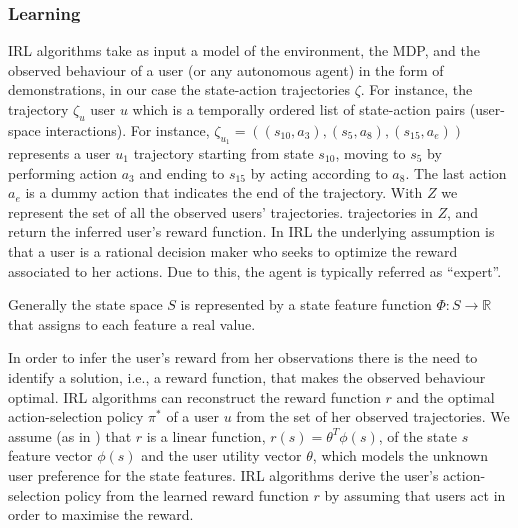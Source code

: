 \subsubsection{Learning}
IRL algorithms take as input a model of the environment, the MDP, and the observed behaviour of a user (or any autonomous agent) in the form of demonstrations, in our case the state-action trajectories $\zeta$.
For instance, the trajectory $\zeta_u$ user $u$ which is a temporally ordered list of state-action pairs (user-space interactions). 
For instance, $\zeta_{u_1} = ((s_{10},a_{3}), (s_5,a_8), (s_{15}, a_e))$ represents a user $u_1$ trajectory starting from state $s_{10}$, moving to $s_5$ by performing action $a_3$ 
and ending to $s_{15}$ by acting according to $a_8$. The last action $a_e$ is a dummy action that indicates the end of the trajectory. With $Z$ we represent the set of all the observed users' trajectories. 
trajectories in $Z$,
and return the inferred user's reward function. In IRL the underlying assumption is that a user is a rational decision maker who seeks to optimize the reward associated to her actions. Due to this, the agent is typically referred as ``expert''.

Generally the state space $S$ is represented by a state feature function $\Phi:S \rightarrow \mathbb{R}$ that assigns to each feature a real value.


In order to infer the user's reward from her observations there is the need to identify a solution, i.e., a reward function, that makes the observed behaviour optimal. 
IRL algorithms can reconstruct the reward function $r$ and the optimal action-selection policy $\pi^*$ of a user $u$ from the set of her observed trajectories. We assume (as in \cite{ng:2000}) that $r$ is a linear function, $r(s) = \theta^T\phi(s)$, of the state $s$ feature vector $\phi(s)$ 
and the user utility vector $\theta$, which models the unknown user preference for the state features. IRL algorithms derive the user's action-selection policy from the learned reward function $r$ by assuming that users act in order to maximise the reward.

